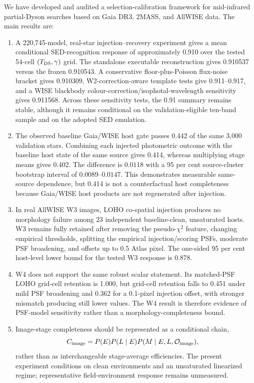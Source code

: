 \documentclass[fleqn,usenatbib]{mnras}
\begin{document}
We have developed and audited a selection-calibration framework for mid-infrared partial-Dyson searches based on Gaia DR3, 2MASS, and AllWISE data. The main results are:

\begin{enumerate}
\item A 220,745-model, real-star injection--recovery experiment gives a mean conditional SED-recognition response of approximately 0.910 over the tested 54-cell $(T_{\rm DS},\gamma)$ grid. The standalone executable reconstruction gives 0.910537 versus the frozen 0.910543. A conservative floor-plus-Poisson flux-noise bracket gives 0.910309, W2-correction-aware template tests give 0.911--0.917, and a WISE blackbody colour-correction/isophotal-wavelength sensitivity gives 0.911568. Across these sensitivity tests, the 0.91 summary remains stable, although it remains conditional on the validation-eligible ten-band sample and on the adopted SED emulation.

\item The observed baseline Gaia/WISE host gate passes 0.442 of the same 3,000 validation stars. Combining each injected photometric outcome with the baseline host state of the same source gives 0.414, whereas multiplying stage means gives 0.402. The difference is $0.0118$ with a 95 per cent source-cluster bootstrap interval of $0.0089$--$0.0147$. This demonstrates measurable same-source dependence, but 0.414 is not a counterfactual host completeness because Gaia/WISE host products are not regenerated after injection.

\item In real AllWISE W3 images, LOHO co-spatial injection produces no morphology failure among 23 independent baseline-clean, unsaturated hosts. W3 remains fully retained after removing the pseudo-$\chi^2$ feature, changing empirical thresholds, splitting the empirical injection/scoring PSFs, moderate PSF broadening, and offsets up to 0.5 Atlas pixel. The one-sided 95 per cent host-level lower bound for the tested W3 response is 0.878.

\item W4 does not support the same robust scalar statement. Its matched-PSF LOHO grid-cell retention is 1.000, but grid-cell retention falls to 0.451 under mild PSF broadening and 0.362 for a 0.1-pixel injection offset, with stronger mismatch producing still lower values. The W4 result is therefore evidence of PSF-model sensitivity rather than a morphology-completeness bound.

\item Image-stage completeness should be represented as a conditional chain,
\begin{equation}
C_{\rm image}=P(E)P(L\mid E)P(M\mid E,L,\mathcal{O}_{\rm image}),
\end{equation}
rather than as interchangeable stage-average efficiencies. The present experiment conditions on clean environments and an unsaturated linearized regime; representative field-environment response remains unmeasured.


\end{enumerate}
\end{document}
